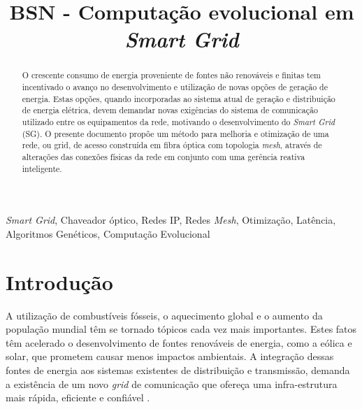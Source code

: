\documentclass[conference]{IEEEtran}
\begin{document}
\title{BSN - Computação evolucional em \emph{Smart Grid}
}

\author{
\and
{}
\and
{}
}

\maketitle

\begin{abstract}
O crescente consumo de energia proveniente de fontes não renováveis e finitas tem incentivado o avanço no desenvolvimento e utilização de novas opções de geração de energia. Estas opções, quando incorporadas ao sistema atual de geração e distribuição de energia elétrica, devem demandar novas exigências do sistema de comunicação utilizado entre os equipamentos da rede, motivando o desenvolvimento do \emph{Smart Grid} (SG). O presente documento propõe um método para melhoria e otimização de uma rede, ou grid, de acesso construída em fibra óptica com topologia \emph{mesh}, através de alterações das conexões físicas da rede em conjunto com uma gerência reativa inteligente.
\end{abstract}

\begin{IEEEkeywords}
\emph{Smart Grid}, Chaveador óptico, Redes IP, Redes \emph{Mesh}, Otimização, Latência, Algoritmos Genéticos, Computação Evolucional
\end{IEEEkeywords}

\section{Introdução}
A utilização de combustíveis fósseis, o aquecimento global e o aumento da população mundial têm se tornado tópicos cada vez mais importantes. Estes fatos têm acelerado o desenvolvimento de fontes renováveis de energia, como a eólica e solar, que prometem causar menos impactos ambientais. A integração dessas fontes de energia aos sistemas existentes de distribuição e transmissão, demanda a existência de um novo \emph{grid} de comunicação que ofereça uma infra-estrutura mais rápida, eficiente e confiável \cite{Art-Gungor2013}.
\end{document}
